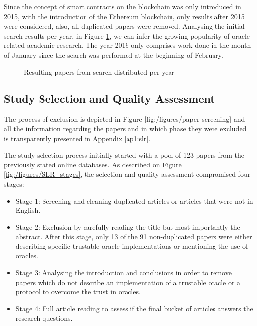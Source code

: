 Since the concept of smart contracts on the blockchain was only introduced in 2015, with the introduction of the Ethereum blockchain, only results after 2015 were considered, also, all duplicated papers were removed. Analysing the initial search results per year, in Figure \ref{search-results-per-year}, we can infer the growing popularity of oracle-related academic research. The year 2019 only comprises work done in the month of January since the search was performed at the beginning of February.

\begin{figure}[H]
  \centering
  \caption{Resulting papers from search distributed per year}
  \label{search-results-per-year}
\end{figure}


\subsection{Study Selection and Quality Assessment}

The process of exclusion is depicted in Figure \ref{fig:/figures/paper-screening} and all the information regarding the papers and in which phase they were excluded is transparently presented in Appendix \ref{ap1:slr}.

The study selection process initially started with a pool of 123 papers from the previously stated online databases. As described on Figure \ref{fig:/figures/SLR_stages}, the selection and quality assessment compromised four stages:
\begin{itemize}
  \item Stage 1: Screening and cleaning duplicated articles or articles that were not in English.
  \item Stage 2: Exclusion by carefully reading the title but most importantly the abstract. After this stage, only 13 of the 91 non-duplicated papers were either describing specific trustable oracle implementations or mentioning the use of oracles.
  \item Stage 3: Analysing the introduction and conclusions in order to remove papers which do not describe an implementation of a trustable oracle or a protocol to overcome the trust in oracles.
  \item Stage 4: Full article reading to assess if the final bucket of articles answers the research questions.
\end{itemize}

